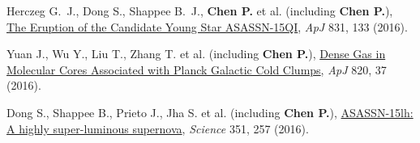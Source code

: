 \item Herczeg G.~J., Dong S., Shappee B.~J., \textbf{Chen P.} et al. (including \textbf{Chen P.}), \href{https://ui.adsabs.harvard.edu/abs/2016ApJ...831..133H}{The Eruption of the Candidate Young Star ASASSN-15QI}, \textit{ApJ} 831, 133 (2016).

\item Yuan J., Wu Y., Liu T., Zhang T. et al. (including \textbf{Chen P.}), \href{https://ui.adsabs.harvard.edu/abs/2016ApJ...820...37Y}{Dense Gas in Molecular Cores Associated with Planck Galactic Cold Clumps}, \textit{ApJ} 820, 37 (2016).

\item Dong S., Shappee B., Prieto J., Jha S. et al. (including \textbf{Chen P.}), \href{https://ui.adsabs.harvard.edu/abs/2016Sci...351..257D}{ASASSN-15lh: A highly super-luminous supernova}, \textit{Science} 351, 257 (2016).
